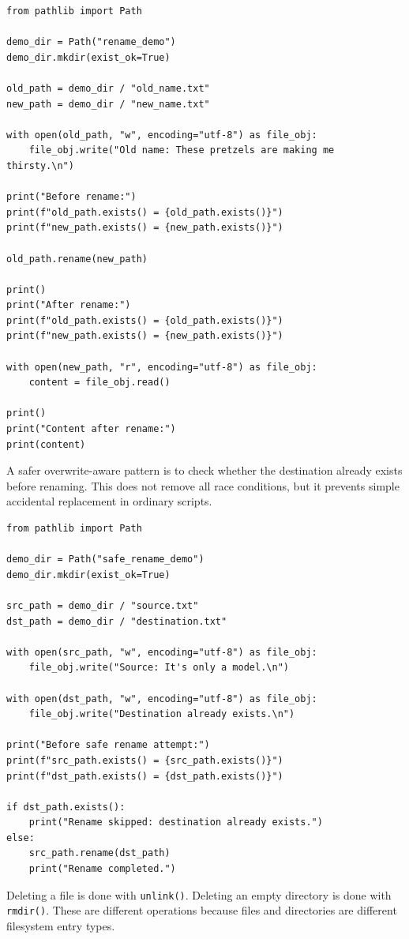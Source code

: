 \begin{verbatim}
from pathlib import Path

demo_dir = Path("rename_demo")
demo_dir.mkdir(exist_ok=True)

old_path = demo_dir / "old_name.txt"
new_path = demo_dir / "new_name.txt"

with open(old_path, "w", encoding="utf-8") as file_obj:
    file_obj.write("Old name: These pretzels are making me thirsty.\n")

print("Before rename:")
print(f"old_path.exists() = {old_path.exists()}")
print(f"new_path.exists() = {new_path.exists()}")

old_path.rename(new_path)

print()
print("After rename:")
print(f"old_path.exists() = {old_path.exists()}")
print(f"new_path.exists() = {new_path.exists()}")

with open(new_path, "r", encoding="utf-8") as file_obj:
    content = file_obj.read()

print()
print("Content after rename:")
print(content)
\end{verbatim}

A safer overwrite-aware pattern is to check whether the destination already exists before renaming. This does not remove all race conditions, but it prevents simple accidental replacement in ordinary scripts.

\begin{verbatim}
from pathlib import Path

demo_dir = Path("safe_rename_demo")
demo_dir.mkdir(exist_ok=True)

src_path = demo_dir / "source.txt"
dst_path = demo_dir / "destination.txt"

with open(src_path, "w", encoding="utf-8") as file_obj:
    file_obj.write("Source: It's only a model.\n")

with open(dst_path, "w", encoding="utf-8") as file_obj:
    file_obj.write("Destination already exists.\n")

print("Before safe rename attempt:")
print(f"src_path.exists() = {src_path.exists()}")
print(f"dst_path.exists() = {dst_path.exists()}")

if dst_path.exists():
    print("Rename skipped: destination already exists.")
else:
    src_path.rename(dst_path)
    print("Rename completed.")
\end{verbatim}

Deleting a file is done with \texttt{unlink()}. Deleting an empty directory is done with \texttt{rmdir()}. These are different operations because files and directories are different filesystem entry types.

